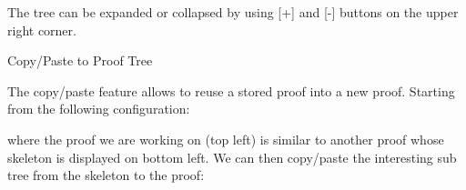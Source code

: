 
The tree can be expanded or collapsed by using [+] and [-] buttons on the upper right corner.

Copy/Paste to Proof Tree

The copy/paste feature allows to reuse a stored proof into a new proof. Starting from the following configuration: 


where the proof we are working on (top left) is similar to another proof whose skeleton is displayed on bottom left. We can then copy/paste the interesting sub tree from the skeleton to the proof: 




